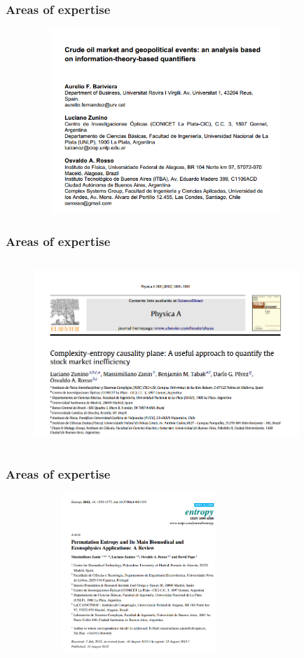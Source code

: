 \documentclass[10pt, compress]{beamer}
\begin{document}
\begin{frame}[fragile]
\frametitle{Areas of expertise}
\begin{figure}
  \centering
   \includegraphics[width=10cm,height=7cm]{CrudeOil.png}
\end{figure}
\end{frame}

\begin{frame}[fragile]
\frametitle{Areas of expertise}
\begin{figure}
  \centering
   \includegraphics[width=10cm,height=7cm]{StockMarket.png}
\end{figure}
\end{frame}

\begin{frame}[fragile]
\frametitle{Areas of expertise}

\begin{figure}
  \centering
   \includegraphics[width=8cm,height=6cm]{Biomedical.png}
\end{figure}
\end{frame}
\end{document}
